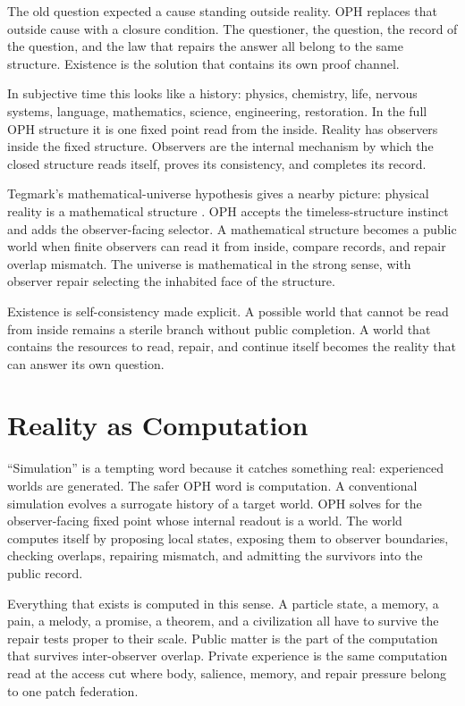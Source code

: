\documentclass[11pt]{article}
\theoremstyle{remark}
\theoremstyle{plain}
\begin{document}
The old question expected a cause standing outside reality. OPH replaces that
outside cause with a closure condition. The questioner, the question, the
record of the question, and the law that repairs the answer all belong to the
same structure. Existence is the solution that contains its own proof channel.

In subjective time this looks like a history: physics, chemistry, life,
nervous systems, language, mathematics, science, engineering, restoration. In
the full OPH structure it is one fixed point read from the inside. Reality has
observers inside the fixed structure. Observers are the internal mechanism by
which the closed structure reads itself, proves its consistency, and completes
its record.

Tegmark's mathematical-universe hypothesis gives a nearby picture:
physical reality is a mathematical structure
\cite{Tegmark2007}. OPH accepts the timeless-structure instinct and adds the
observer-facing selector. A mathematical structure becomes a public world when
finite observers can read it from inside, compare records, and repair overlap
mismatch. The universe is mathematical in the strong sense, with
observer repair selecting the inhabited face of the structure.

Existence is self-consistency made explicit. A possible world that
cannot be read from inside remains a sterile branch without public completion.
A world that contains the resources to read, repair, and continue itself becomes
the reality that can answer its own question.

\section{Reality as Computation}

``Simulation'' is a tempting word because it catches something real: experienced
worlds are generated. The safer OPH word is computation. A conventional
simulation evolves a surrogate history of a target world. OPH solves for the
observer-facing fixed point whose internal readout is a world. The world
computes itself by proposing local states, exposing them to observer
boundaries, checking overlaps, repairing mismatch, and admitting the survivors
into the public record.

Everything that exists is computed in this sense. A particle state, a memory, a
pain, a melody, a promise, a theorem, and a civilization all have to survive the
repair tests proper to their scale. Public matter is the part of the computation
that survives inter-observer overlap. Private experience is the same computation
read at the access cut where body, salience, memory, and repair pressure belong
to one patch federation.
\end{document}
